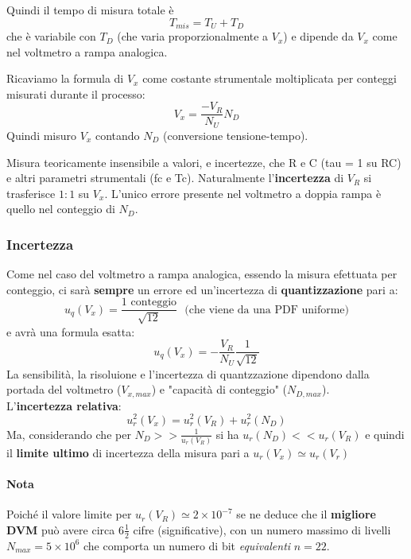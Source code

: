 \documentclass[a4paper,11pt]{report}
\begin{document}
Quindi il tempo di misura totale è 
$$
  T_{mis} = T_U + T_D
$$
che è variabile con $ T_D $ (che varia proporzionalmente a $ V_x $) e dipende da $ V_x $ come nel voltmetro a rampa analogica.

Ricaviamo la formula di $ V_x $ come costante strumentale moltiplicata per conteggi misurati durante il processo:
\begin{equation}
  V_x = \frac{-V_R}{N_U}N_D
\end{equation}
Quindi misuro $ V_x $ contando $ N_D $ (conversione tensione-tempo).

Misura teoricamente insensibile a valori, e incertezze, che R e C (tau = 1 su RC) e altri parametri strumentali (fc e Tc). Naturalmente l'\textbf{incertezza} di  $ V_R $ si trasferisce $ 1:1 $ su $ V_x $. L'unico errore presente nel voltmetro a doppia rampa è quello nel conteggio di $ N_D $.

\subsubsection{Incertezza}
Come nel caso del voltmetro a rampa analogica, essendo la misura efettuata per conteggio, ci sarà \textbf{sempre} un errore ed un'incertezza di \textbf{quantizzazione} pari a:
$$
  u_q(V_x) = \frac{\text{1 conteggio}}{\sqrt{12}}~~~\text{(che viene da una PDF uniforme)}
$$
e avrà una formula esatta:
$$
  u_q(V_x) = -\frac{V_R}{N_U}\frac{1}{\sqrt{12}}
$$
La sensibilità, la risoluione e l'incertezza di quantzzazione dipendono dalla portada del voltmetro ($ V_{x,max} $) e "capacità di conteggio" ($ N_{D,max} $).\\

L'\textbf{incertezza relativa}:
$$
  u_r^2 (V_x) = u_r^2(V_R)+u_r^2(N_D)
$$
Ma, considerando che per $ N_D >> \frac{1}{u_r(V_R)} $ si ha $ u_r(N_D) << u_r(V_R) $ e  quindi il \textbf{limite ultimo} di incertezza della misura pari a $ u_r(V_x) \simeq u_r(V_r)$

\paragraph{Nota} Poiché il valore limite per $ u_r(V_R) \simeq 2\times 10^{-7}$ se ne deduce che il \textbf{migliore DVM} può avere circa $ 6\frac{1}{2} $ cifre (significative), con un numero massimo di livelli $ N_{max} = 5\times 10^6 $ che comporta un numero di bit \textit{equivalenti} $ n = 22 $.

\newpage
\end{document}
